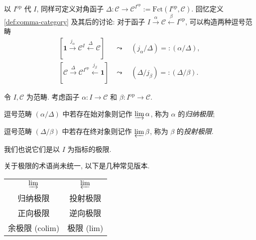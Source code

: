以 $I^{\text{op}}$ 代 $I$, 同样可定义对角函子 $\Delta: \mathcal{C} \to \mathcal{C}^{I^{\text{op}}} := \text{Fct}(I^{\text{op}}, \mathcal{C})$. 回忆定义 \ref{def:comma-category} 及其后的讨论: 对于函子 $I \xrightarrow{\alpha} \mathcal{C} \xleftarrow{\beta} I^\text{op}$, 可以构造两种逗号范畴
\begin{align*}
	\left[ \mathbf{1} \xrightarrow{j_\alpha} \mathcal{C}^I \xleftarrow{\Delta} \mathcal{C} \right] & \leadsto \quad (j_\alpha/\Delta) =: (\alpha / \Delta), \\
	\left[ \mathcal{C} \xrightarrow{\Delta} \mathcal{C}^{I^\text{op}} \xleftarrow{j_\beta} \mathbf{1} \right] & \leadsto \quad (\Delta/j_\beta) =: (\Delta/\beta).
\end{align*}
\begin{definition}[极限]\label{def:limit}
	令 $I, \mathcal{C}$ 为范畴. 考虑函子 $\alpha: I \to \mathcal{C}$ 和 $\beta: I^\text{op} \to \mathcal{C}$.
	\begin{compactenum}
		\item 逗号范畴 $(\alpha / \Delta)$ 中若存在始对象则记作 $\varinjlim \alpha$, 称为 $\alpha$ 的\emph{归纳极限};
		\item 逗号范畴 $(\Delta / \beta)$ 中若存在终对象则记作 $\varprojlim \beta$, 称为 $\beta$ 的\emph{投射极限}.
	\end{compactenum}
	我们也说它们是以 $I$ 为指标的极限.
\end{definition}
关于极限的术语尚未统一, 以下是几种常见版本.
\begin{center}\begin{tabular}{c|c}
	$\varinjlim$ & $\varprojlim$ \\
	归纳极限 & 投射极限 \\
	正向极限 & 逆向极限 \\
	余极限 ($\text{colim}$) & 极限 ($\text{lim}$)
\end{tabular}\end{center}

